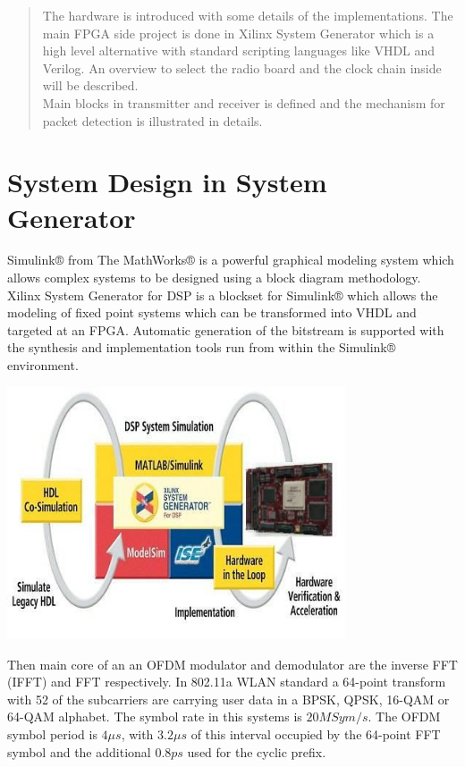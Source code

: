 \begin{abstract}
The hardware is introduced with some details of the implementations. The main FPGA side project is done in Xilinx System Generator which is a high level alternative with standard scripting languages like VHDL and Verilog. An overview to select the radio board and the clock chain inside will be described.\\
Main blocks in transmitter and receiver is defined and the mechanism for packet detection is illustrated in details.

\end{abstract}

\section{System Design in System Generator}
\label{sec_anasim}

Simulink® from The MathWorks® is a powerful graphical modeling system which allows complex systems to be designed using a block diagram methodology. Xilinx System Generator for DSP is a blockset for Simulink® which allows the modeling of fixed point systems which can be transformed into VHDL and targeted at an FPGA. Automatic generation of the bitstream is supported with the synthesis and implementation tools run from within the Simulink® environment.\\

\begin{center}
\includegraphics[width=10cm]{content/fig/systemGen.JPG}
\label{systemGen}
\end{center}


Then main core of an an OFDM modulator and demodulator are the inverse FFT (IFFT) and FFT respectively. In 802.11a WLAN standard a 64-point transform with 52 of the subcarriers are carrying user data in a BPSK,
QPSK, 16-QAM or 64-QAM alphabet. The symbol rate in this systems is $20 MSym/s$. The OFDM symbol period
is $4 \mu s$, with $3.2 \mu s$ of this interval occupied by the 64-point FFT symbol and the additional $0.8 ps$ used for the cyclic prefix.\\

